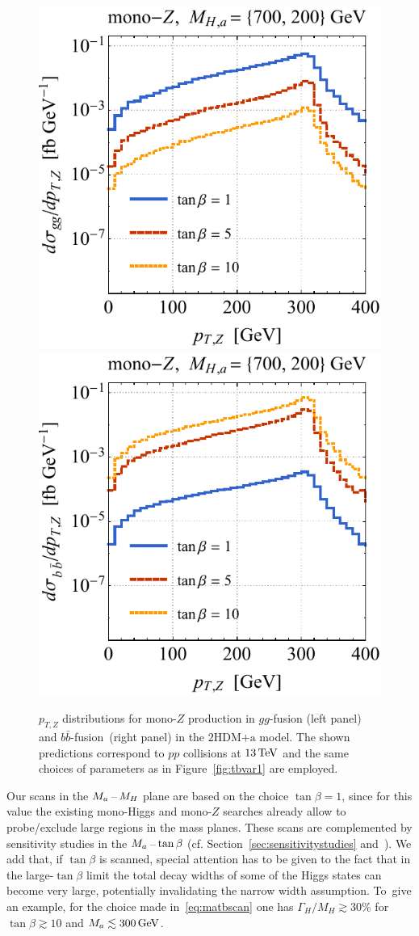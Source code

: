\documentclass[a4paper, 11pt,notoc]{article}
\newcommand{\ma}{\ensuremath{M_{a}}\xspace}
\newcommand{\hdma}{\ensuremath{\textrm{2HDM+a}}\xspace}
\begin{document}
 \begin{figure}[t!]
\centering
\includegraphics[height=0.45\textwidth]{tblz.pdf} \qquad 
\includegraphics[height=0.45\textwidth]{tbrz.pdf}
\vspace{2mm}
\vspace{2mm}
\caption{\label{fig:tbvar2} 
$p_{T,Z}$ distributions for mono-$Z$ production in $gg$-fusion (left panel) and $b \bar b$-fusion~(right panel) in the \hdma model. The shown predictions correspond to $pp$ collisions at $13 \, {\rm TeV}$ and the same choices of parameters as in Figure~\ref{fig:tbvar1} are employed.}
\end{figure}

Our  scans in the $M_{a}\hspace{0.5mm}$--$\hspace{0.5mm} M_H$ plane are based on the choice $\tan \beta = 1$, since for this value the existing mono-Higgs and mono-$Z$ searches already allow to probe/exclude large regions in the mass planes.  These  scans are complemented by sensitivity studies in the $\ma \hspace{0.5mm}$--$\hspace{0.5mm} \tan \beta$ (cf. Section~\ref{sec:sensitivitystudies} and~\cite{No:2015xqa,Bauer:2017ota,Pani:2017qyd}).  We add that, if $\tan \beta$ is scanned, special attention has to be given to the fact that in the large-$\tan \beta$ limit the total decay widths of some of the Higgs states can become very large, potentially invalidating the narrow width assumption.   To~give an example, for the choice made in~\eqref{eq:matbscan} one has $\Gamma_{H}/M_H \gtrsim 30\%$ for $\tan \beta \gtrsim 10$ and $M_a \lesssim 300 \, {\rm GeV}$. 
\end{document}
